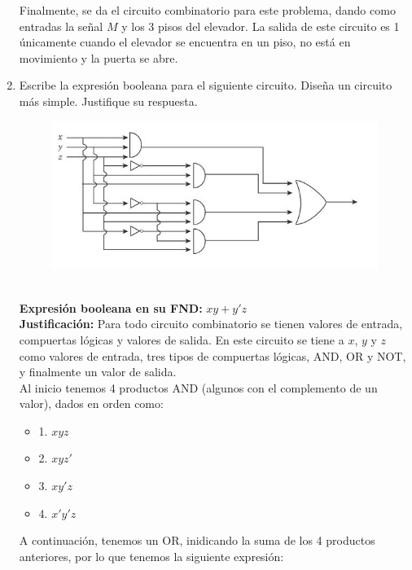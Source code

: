 \documentclass[12pt]{article} %
\begin{document}
\begin{enumerate}
        Finalmente, se da el circuito combinatorio para este problema,
        dando como entradas la señal $M$ y los 3 pisos del elevador. La
        salida de este circuito es 1 únicamente cuando el elevador se
        encuentra en un piso, no está en movimiento y la puerta se abre. 
        \\

        \item Escribe la expresión booleana para el siguiente circuito. 
            Diseña un circuito más simple. Justifique su respuesta.
            \begin{figure}[h!]
                \centering 
                \includegraphics[scale=0.8]{circuito.jpg}
            \end{figure}
            \\
            \textbf{Expresión booleana en su FND:} $xy + y'z$ 
            \\

            \textbf{Justificación:} Para todo circuito combinatorio se 
            tienen valores de entrada, compuertas lógicas y valores de 
            salida. En este circuito se tiene a $x$, $y$ y $z$ como 
            valores de entrada, tres tipos de compuertas lógicas, AND, 
            OR y NOT, y finalmente un valor de salida. \\
            Al inicio tenemos 4 productos AND (algunos con el complemento 
            de un valor), dados en orden como:
                \begin{itemize}
                    \item 1. $xyz$
                    \item 2. $xyz'$
                    \item 3. $xy'z$
                    \item 4. $x'y'z$
                \end{itemize}
            A continuación, tenemos un OR, inidicando la suma de los 4 
            productos anteriores, por lo que tenemos la siguiente 
            expresión:
            

\end{enumerate}
\end{document}
